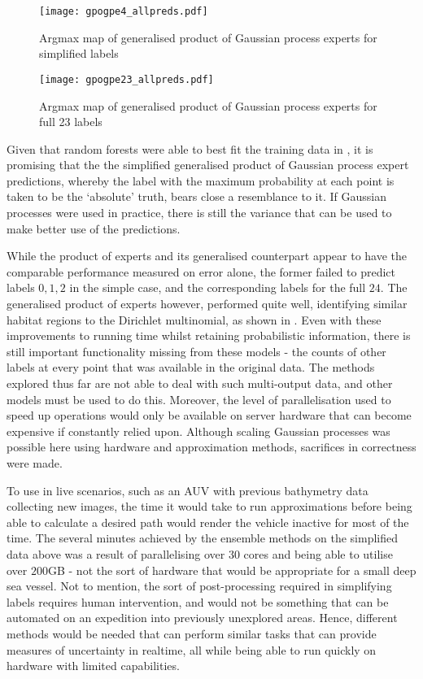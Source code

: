 \begin{figure}
    \texttt{[image: gpogpe4\_allpreds.pdf]}
    \caption{Argmax map of generalised product of Gaussian process experts for simplified labels}
    \label{fig:gpogpe4}
\end{figure}

\begin{figure}
    \texttt{[image: gpogpe23\_allpreds.pdf]}
    \caption{Argmax map of generalised product of Gaussian process experts for full 23 labels }
    \label{fig:gpogpe23}
\end{figure}

Given that random forests were able to best fit the training data in , it is promising that the the simplified generalised product of Gaussian process expert predictions, whereby the label with the maximum probability at each point is taken to be the `absolute' truth, bears close a resemblance to it. If Gaussian processes were used in practice, there is still the variance that can be used to make better use of the predictions. 

While the product of experts and its generalised counterpart appear to have the comparable performance measured on error alone, the former failed to predict labels $0, 1, 2$ in the simple case, and the corresponding labels for the full $24$. The generalised product of experts however, performed quite well, identifying similar habitat regions to the Dirichlet multinomial, as shown in . Even with these improvements to running time whilst retaining probabilistic information, there is still important functionality missing from these models - the counts of other labels at every point that was available in the original data. The methods explored thus far are not able to deal with such multi-output data, and other models must be used to do this. Moreover, the level of parallelisation used to speed up operations would only be available on server hardware that can become expensive if constantly relied upon. Although scaling Gaussian processes was possible here using hardware and approximation methods, sacrifices in correctness were made. 

To use in live scenarios, such as an AUV with previous bathymetry data collecting new images, the time it would take to run approximations before being able to calculate a desired path would render the vehicle inactive for most of the time. The several minutes achieved by the ensemble methods on the simplified data above was a result of parallelising over $30$ cores and being able to utilise over $200$GB - not the sort of hardware that would be appropriate for a small deep sea vessel. Not to mention, the sort of post-processing required in simplifying labels requires human intervention, and would not be something that can be automated on an expedition into previously unexplored areas. Hence, different methods would be needed that can perform similar tasks that can provide measures of uncertainty in realtime, all while being able to run quickly on hardware with limited capabilities.

\pagebreak
